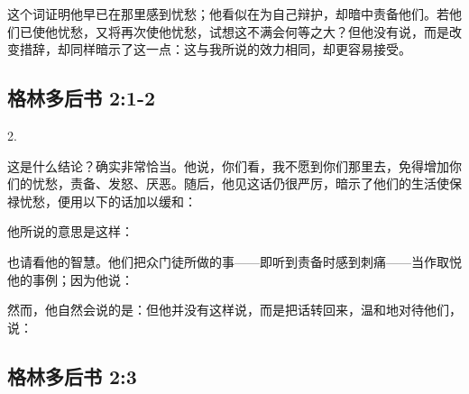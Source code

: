 \par

这个词证明他早已在那里感到忧愁；他看似在为自己辩护，却暗中责备他们。若他们已使他忧愁，又将再次使他忧愁，试想这不满会何等之大？但他没有说，而是改变措辞，却同样暗示了这一点：这与我所说的效力相同，却更容易接受。\par


\subsection{格林多后书 2:1-2}

2.\par

这是什么结论？确实非常恰当。他说，你们看，我不愿到你们那里去，免得增加你们的忧愁，责备、发怒、厌恶。随后，他见这话仍很严厉，暗示了他们的生活使保禄忧愁，便用以下的话加以缓和：\par

他所说的意思是这样：\par

也请看他的智慧。他们把众门徒所做的事——即听到责备时感到刺痛——当作取悦他的事例；因为他说：\par

然而，他自然会说的是：但他并没有这样说，而是把话转回来，温和地对待他们，说：\par


\subsection{格林多后书 2:3}

\par

